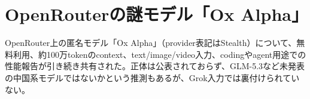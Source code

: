 \section{OpenRouterの謎モデル「Ox Alpha」}
OpenRouter上の匿名モデル「Ox Alpha」（provider表記はStealth）について、無料利用、約100万tokenのcontext、text/image/video入力、codingやagent用途での性能報告が引き続き共有された。正体は公表されておらず、GLM-5.3など未発表の中国系モデルではないかという推測もあるが、Grok入力では裏付けられていない。

